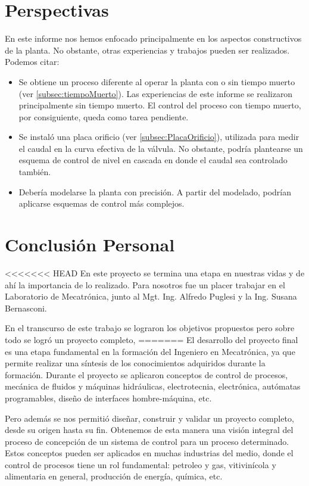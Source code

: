 \section{Perspectivas}
\label{sec:Perspectivas}
En este informe nos hemos enfocado principalmente en los aspectos constructivos
de la planta.
No obstante, otras experiencias y trabajos pueden ser realizados. Podemos citar:
\begin{itemize}
 \item Se obtiene un proceso diferente al operar la planta con o sin tiempo
muerto (ver \ref{subsec:tiempoMuerto}).
Las experiencias de este informe se realizaron principalmente sin tiempo
muerto.
El control del proceso con tiempo muerto, por consiguiente, queda como tarea
pendiente.
\item Se instaló una placa orificio (ver \ref{subsec:PlacaOrificio}), utilizada
para medir el caudal en la curva efectiva de la válvula.
No obstante, podría plantearse un esquema de control de nivel en cascada en
donde el caudal sea controlado también.
\item Debería modelarse la planta con precisión.
A partir del modelado, podrían aplicarse esquemas de control más
complejos.
\end{itemize}

\section{Conclusión Personal}
\label{sec:ConclusionPersonal}

<<<<<<< HEAD
En este proyecto se termina una etapa en nuestras vidas y de ahí la importancia
de lo realizado. Para nosotros fue un placer trabajar en el Laboratorio
de Mecatrónica, junto al Mgt. Ing. Alfredo Puglesi y la Ing. Susana Bernasconi.

En el transcurso de este trabajo se lograron los objetivos propuestos
pero sobre todo se logró un proyecto completo, 
=======
El desarrollo del proyecto final es una etapa fundamental en la formación del
Ingeniero en Mecatrónica, ya que permite realizar una síntesis de los
conocimientos adquiridos durante la formación.
Durante el proyecto se aplicaron conceptos de control de
procesos, mecánica de fluidos y máquinas hidráulicas, electrotecnia,
electrónica, autómatas programables, diseño de interfaces hombre-máquina, etc.

Pero además se nos permitió diseñar, construir y validar un proyecto completo,
desde su origen hasta su fin.
Obtenemos de esta manera una visión integral del proceso de concepción de un
sistema de control para un proceso determinado.
Estos conceptos pueden ser aplicados en muchas industrias del medio, donde el
control de procesos tiene un rol fundamental: petroleo y gas, vitivinícola y
alimentaria en general, producción de energía, química, etc.

